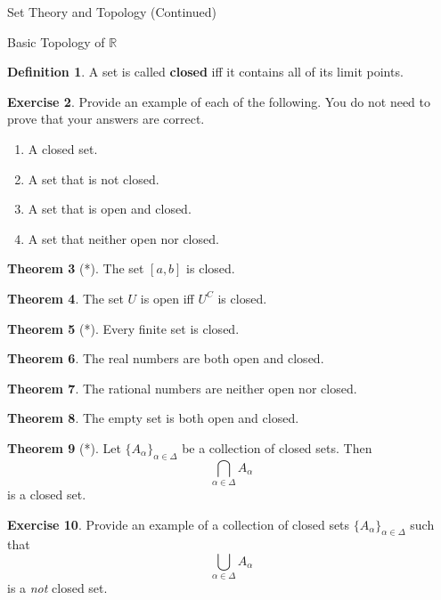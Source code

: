 \documentclass[11pt]{article}
\theoremstyle{definition}
\newtheorem{theorem}{Theorem}[section]
\newtheorem{definition}[theorem]{Definition}
\newtheorem{exercise}[theorem]{Exercise}
\begin{document}
\begin{section}{Set Theory and Topology (Continued)}
\begin{subsection}{Basic Topology of $\mathbb{R}$}
\begin{definition}
A set is called \textbf{closed} iff it contains all of its limit points.
\end{definition}

\begin{exercise}
Provide an example of each of the following.  You do not need to prove that your answers are correct.
\begin{enumerate}
\item A closed set.
\item A set that is not closed.
\item A set that is open and closed.
\item A set that neither open nor closed.
\end{enumerate}

\end{exercise}

\begin{theorem}[*]
The set $[a,b]$ is closed.
\end{theorem}

\begin{theorem}
The set $U$ is open iff $U^C$ is closed.
\end{theorem}

\begin{theorem}[*]
Every finite set is closed.
\end{theorem}

\begin{theorem}
The real numbers are both open and closed.
\end{theorem}

\begin{theorem}
The rational numbers are neither open nor closed.
\end{theorem}

\begin{theorem}
The empty set is both open and closed.
\end{theorem}

\begin{theorem}[*]\label{intersection of closed sets}
Let $\{A_{\alpha}\}_{\alpha\in\Delta}$ be a collection of closed sets.  Then
\[
\bigcap_{\alpha\in \Delta} A_{\alpha}
\]
is a closed set.
\end{theorem}

\begin{exercise}\label{union of closed sets}
Provide an example of a collection of closed sets $\{A_{\alpha}\}_{\alpha\in\Delta}$ such that 
\[
\bigcup_{\alpha\in \Delta} A_{\alpha}
\]
is a \emph{not} closed set.
\end{exercise}


\end{subsection}
\end{section}
\end{document}
